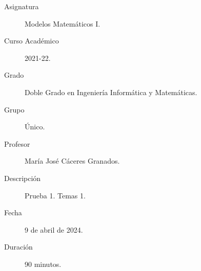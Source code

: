 \documentclass[12pt]{article}
\begin{document}

    
    

    \begin{description}
        \item[Asignatura] Modelos Matemáticos I.
        \item[Curso Académico] 2021-22.
        \item[Grado] Doble Grado en Ingeniería Informática y Matemáticas.
        \item[Grupo] Único.
        \item[Profesor] María José Cáceres Granados.
        \item[Descripción] Prueba 1. Temas 1.
        \item[Fecha] 9 de abril de 2024.
        \item[Duración] 90 minutos.
    
    \end{description}
    \newpage
    
\end{document}
